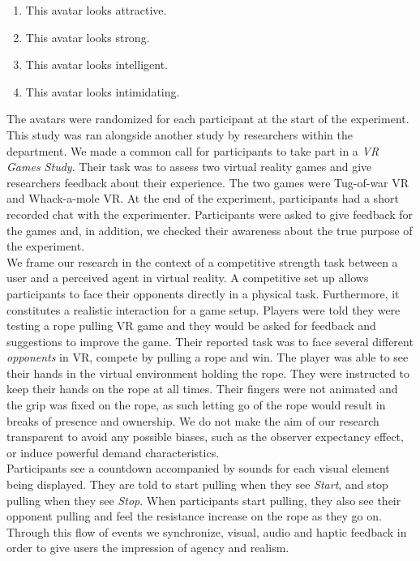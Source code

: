 \begin{enumerate}
\itemsep0em 
\item This avatar looks attractive.
\item This avatar looks strong.
\item This avatar looks intelligent.
\item This avatar looks intimidating.
\end{enumerate}
The avatars were randomized for each participant at the start of the experiment. This study was ran alongside another study by researchers within the department. We made a common call for participants to take part in a \textit{VR Games Study}. Their task was to assess two virtual reality games and give researchers feedback about their experience. The two games were Tug-of-war VR and Whack-a-mole VR. At the end of the experiment, participants had a short recorded chat with the experimenter. Participants were asked to give feedback for the games and, in addition, we checked their awareness about the true purpose of the experiment.
\\
We frame our research in the context of a competitive strength task between a user and a perceived agent in virtual reality. A competitive set up allows participants to face their opponents directly in a physical task. Furthermore, it constitutes a realistic interaction for a game setup. Players were told they were testing a rope pulling VR game and they would be asked for feedback and suggestions to improve the game.
Their reported task was to face several different \textit{opponents} in VR, compete by pulling a rope and win. The player was able to see their hands in the virtual environment holding the rope. They were instructed to keep their hands on the rope at all times. Their fingers were not animated and the grip was fixed on the rope, as such letting go of the rope would result in breaks of presence and ownership. We do not make the aim of our research transparent to avoid any possible biases, such as the observer expectancy effect, or induce powerful demand characteristics.
\\
Participants see a countdown accompanied by sounds for each visual element being displayed. They are told to start pulling when they see \textit{Start}, and stop pulling when they see \textit{Stop}. When participants start pulling, they also see their opponent pulling and feel the resistance increase on the rope as they go on. Through this flow of events we synchronize, visual, audio and haptic feedback in order to give users the impression of agency and realism. 